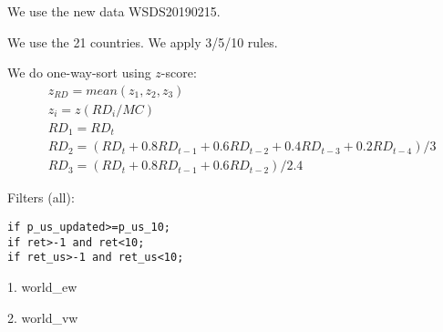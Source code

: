 

\usepackage[T1]{fontenc}




\thispagestyle{fancy}

\newcommand{\code}{\texttt}
\newcommand*{\Commonpath}{20190219/wsds-one-way-decile-benchmark}


We use the new data WSDS20190215.

We use the 21 countries.
We apply 3/5/10 rules.



We do one-way-sort using $z$-score:
$$
\begin{aligned}
& z_{RD} = mean(z_1, z_2, z_3) \\
& z_i = z(RD_i/MC) \\
& RD_1 = RD_t \\
& RD_2 = (RD_t + 0.8RD_{t-1} + 0.6RD_{t-2} + 0.4RD_{t-3} + 0.2RD_{t-4})/3 \\
& RD_3 = (RD_t + 0.8RD_{t-1} + 0.6RD_{t-2})/2.4 
\end{aligned}
$$



Filters (all):

\code{if p\_us\_updated>=p\_us\_10;} \\
\code{if ret>-1 and ret<10;} \\
\code{if ret\_us>-1 and ret\_us<10;} \\


\small


1. world\_ew


2. world\_vw





